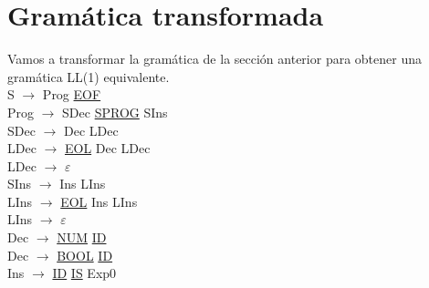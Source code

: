 \documentclass[\main/MemoriaPL.tex]{subfiles}
\begin{document}
  \section{Gramática transformada}
    \par
    Vamos a transformar la gramática de la sección anterior para obtener una gramática LL(1)
    equivalente.\\
    \vspace{2mm}
    S $\rightarrow$ Prog \underline{EOF}\\
    Prog $\rightarrow$ SDec \underline{SPROG} SIns\\
    SDec $\rightarrow$ Dec LDec\\
    LDec $\rightarrow$ \underline{EOL} Dec LDec\\
    LDec $\rightarrow$ $\varepsilon$\\
    SIns $\rightarrow$ Ins LIns\\
    LIns $\rightarrow$ \underline{EOL} Ins LIns\\
    LIns $\rightarrow$ $\varepsilon$\\
    Dec $\rightarrow$ \underline{NUM} \underline{ID}\\
    Dec $\rightarrow$ \underline{BOOL} \underline{ID}\\
    Ins $\rightarrow$ \underline{ID} \underline{IS} Exp0\\
    \vspace{2mm}
\end{document}
